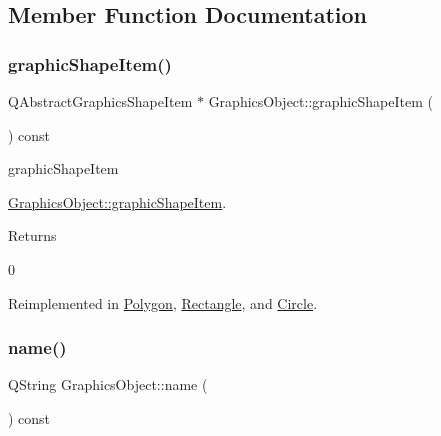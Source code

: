 \subsection{Member Function Documentation}
\mbox{\label{class_graphics_object_ad898be2fdbcc4c57f908cdd6a3feaa44}} 
\subsubsection{\texorpdfstring{graphic\+Shape\+Item()}{graphicShapeItem()}}
{\footnotesize\ttfamily Q\+Abstract\+Graphics\+Shape\+Item $\ast$ Graphics\+Object\+::graphic\+Shape\+Item (\begin{DoxyParamCaption}{ }\end{DoxyParamCaption}) const\hspace{0.3cm}{\ttfamily [virtual]}}



graphic\+Shape\+Item 

\hyperlink{class_graphics_object_ad898be2fdbcc4c57f908cdd6a3feaa44}{Graphics\+Object\+::graphic\+Shape\+Item}.

\begin{DoxyReturn}{Returns}


0 
\end{DoxyReturn}


Reimplemented in \hyperlink{class_polygon_aebf0f177dbc4da17a1822be5a0063b25}{Polygon}, \hyperlink{class_rectangle_aeafbe16d72e37bb155c78a122408d3dc}{Rectangle}, and \hyperlink{class_circle_a2c6dda8b50d9e19448d2e328b74430ce}{Circle}.

\mbox{\label{class_graphics_object_ac5591ff2b8009451c593d1197ce7a162}} 
\subsubsection{\texorpdfstring{name()}{name()}}
{\footnotesize\ttfamily Q\+String Graphics\+Object\+::name (\begin{DoxyParamCaption}{ }\end{DoxyParamCaption}) const}



